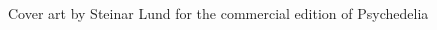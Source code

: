 \begin{figure}[H]
    \centering
    \begin{adjustbox}{width=12cm,center}
    \end{adjustbox}
\caption{Cover art by Steinar Lund for the commercial edition of Psychedelia}
\end{figure}

